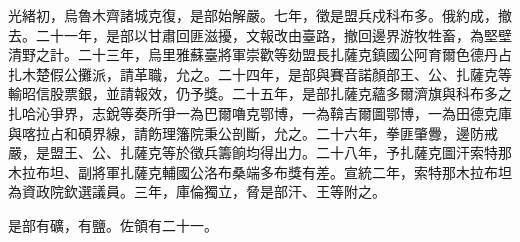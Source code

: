\begin{pinyinscope}
光緒初，烏魯木齊諸城克復，是部始解嚴。七年，徵是盟兵戍科布多。俄約成，撤去。二十一年，是部以甘肅回匪滋擾，文報改由臺路，撤回邊界游牧牲畜，為堅壁清野之計。二十三年，烏里雅蘇臺將軍崇歡等劾盟長扎薩克鎮國公阿育爾色德丹占扎木楚假公攤派，請革職，允之。二十四年，是部與賽音諾顏部王、公、扎薩克等輸昭信股票銀，並請報效，仍予獎。二十五年，是部扎薩克蘊多爾濟旗與科布多之扎哈沁爭界，志銳等奏所爭一為巴爾嚕克鄂博，一為鞥吉爾圖鄂博，一為田德克庫與喀拉占和碩界線，請飭理籓院秉公剖斷，允之。二十六年，拳匪肇釁，邊防戒嚴，是盟王、公、扎薩克等於徵兵籌餉均得出力。二十八年，予扎薩克圖汗索特那木拉布坦、副將軍扎薩克輔國公洛布桑端多布獎有差。宣統二年，索特那木拉布坦為資政院欽選議員。三年，庫倫獨立，脅是部汗、王等附之。

是部有礦，有鹽。佐領有二十一。


\end{pinyinscope}